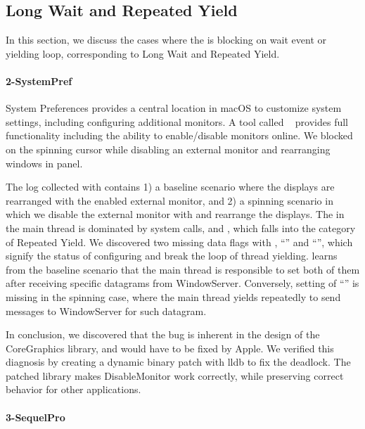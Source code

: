 \subsection{Long Wait and Repeated Yield}
In this section, we discuss the cases where the \spinningnode is blocking
on wait event or yielding loop, corresponding to Long Wait and
Repeated Yield.

\paragraph{2-SystemPref}

System Preferences provides a central location in macOS to customize
system settings, including configuring additional monitors. A tool called
~\cite{disablemonitor} provides full functionality including
the ability to enable/disable monitors online. We blocked on the spinning cursor
while disabling an external monitor and rearranging windows in 
panel.

The log collected with \xxx contains 1) a baseline scenario where the displays
are rearranged with the enabled external monitor, and 2) a spinning scenario in
which we disable the external monitor with  and rearrange
the displays. The \spinningnode in the main thread is dominated by system
calls,  and , which falls into the category of
 Repeated Yield. We discovered two missing data flags with ,
``'' and ``'', which
signify the status of configuring and break the loop of thread yielding. \xxx
learns from the baseline scenario that the main thread is responsible to set
both of them after receiving specific datagrams from WindowServer. Conversely,
setting of ``'' is missing in the spinning case,
where the main thread yields repeatedly to send messages to WindowServer for
such datagram.

In conclusion, we discovered that the bug is inherent in the design of the
CoreGraphics library, and would have to be fixed by Apple. We verified this
diagnosis by creating a dynamic binary patch with lldb to fix the deadlock. The
patched library makes DisableMonitor work correctly, while preserving correct
behavior for other applications.

\paragraph{3-SequelPro}

